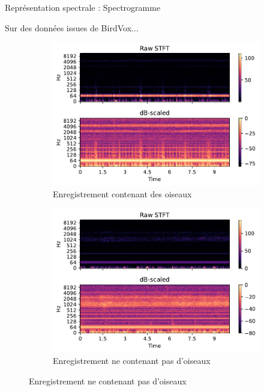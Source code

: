 \documentclass[compress,xcolor=table]{beamer}
\begin{document}
\begin{frame}{Représentation spectrale : Spectrogramme}

    Sur des données issues de BirdVox...

    \begin{figure}[ht]
        \centering
        \begin{subfigure}[b]{0.45\textwidth}
            \centering
            \includegraphics[width=\textwidth]{images/audio/birds.spectrogram.birdvox.pdf}
            \caption{Enregistrement contenant des oiseaux}
            \label{fig:birds.spectrogram.birdvox}
        \end{subfigure}
        \hfill
        \begin{subfigure}[b]{0.45\textwidth}
            \centering
            \includegraphics[width=\textwidth]{images/audio/nobirds.spectrogram.birdvox.pdf}
            \caption{Enregistrement ne contenant pas d'oiseaux}
            \label{fig:nobirds.spectrogram.birdvox}
        \end{subfigure}
    \end{figure}

\end{frame}
\end{document}
